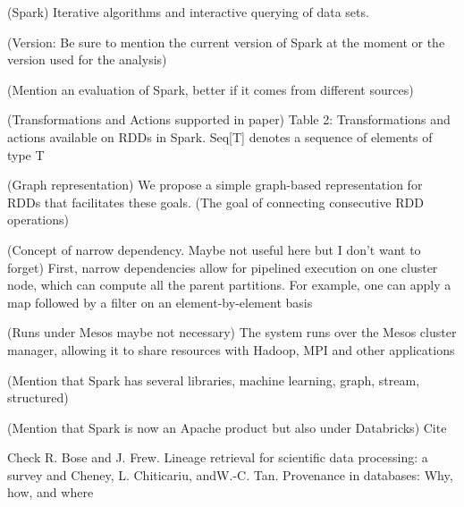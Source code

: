 (Spark) Iterative algorithms and interactive querying of data sets.

(Version: Be sure to mention the current version of Spark at the moment or the version used for the analysis)

(Mention an evaluation of Spark, better if it comes from different sources)

(Transformations and Actions supported in paper) Table 2: Transformations and actions available on RDDs in Spark. Seq[T] denotes a sequence of elements of type T \cite{Zaharia2012a}

(Graph representation) We propose a simple graph-based representation for RDDs that facilitates these goals. (The goal of connecting consecutive RDD operations) \cite{Zaharia2012a}

(Concept of narrow dependency. Maybe not useful here but I don't want to forget) First, narrow dependencies allow for pipelined execution on one cluster node, which can compute all the parent partitions. For example, one can apply a map followed by a filter on an element-by-element basis \cite{Zaharia2012a}

(Runs under Mesos maybe not necessary) The system runs over the Mesos cluster manager, allowing it to share resources with Hadoop, MPI and other applications \cite{Zaharia2012a}

(Mention that Spark has several libraries, machine learning, graph, stream, structured)

(Mention that Spark is now an Apache product but also under Databricks) Cite \cite{WebSpark2017}

Check R. Bose and J. Frew. Lineage retrieval for scientific data processing: a survey and Cheney, L. Chiticariu, andW.-C. Tan. Provenance in databases: Why, how, and where